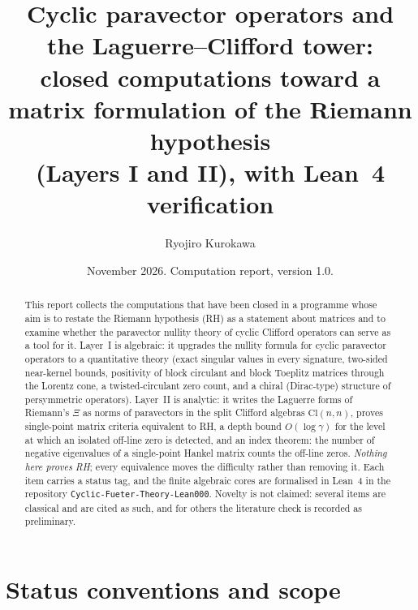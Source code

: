 \documentclass[11pt]{amsart}
\title[Paravector operators and the Laguerre--Clifford tower]{Cyclic paravector operators and the Laguerre--Clifford tower:\\
closed computations toward a matrix formulation of the Riemann hypothesis\\
(Layers I and II), with Lean~4 verification}
\author{Ryojiro Kurokawa}
\date{November 2026. Computation report, version 1.0.}
\theoremstyle{plain}
\theoremstyle{definition}
\newcommand{\Cl}{\mathrm{Cl}}
\begin{document}
\sloppy

\begin{abstract}
This report collects the computations that have been closed in a programme
whose aim is to restate the Riemann hypothesis (RH) as a statement about
matrices and to examine whether the paravector nullity theory of cyclic
Clifford operators can serve as a tool for it. Layer~I is algebraic: it
upgrades the nullity formula for cyclic paravector operators to a
quantitative theory (exact singular values in every signature, two-sided
near-kernel bounds, positivity of block circulant and block Toeplitz
matrices through the Lorentz cone, a twisted-circulant zero count, and a
chiral (Dirac-type) structure of persymmetric operators). Layer~II is
analytic: it writes the Laguerre forms of Riemann's $\Xi$ as norms of
paravectors in the split Clifford algebras $\Cl(n,n)$, proves single-point
matrix criteria equivalent to RH, a depth bound $O(\log\gamma)$ for the level
at which an isolated off-line zero is detected, and an index theorem: the
number of negative eigenvalues of a single-point Hankel matrix counts the
off-line zeros. \emph{Nothing here proves RH}; every equivalence moves the
difficulty rather than removing it. Each item carries a status tag, and the
finite algebraic cores are formalised in Lean~4 in the repository
\texttt{Cyclic-Fueter-Theory-Lean000}. Novelty is not claimed: several items
are classical and are cited as such, and for others the literature check is
recorded as preliminary.
\end{abstract}

\maketitle
\tableofcontents

\section{Status conventions and scope}
\end{document}
